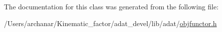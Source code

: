 The documentation for this class was generated from the following file\+:\begin{DoxyCompactItemize}
\item 
/\+Users/archanar/\+Kinematic\+\_\+factor/adat\+\_\+devel/lib/adat/\mbox{\hyperlink{lib_2adat_2objfunctor_8h}{objfunctor.\+h}}\end{DoxyCompactItemize}
